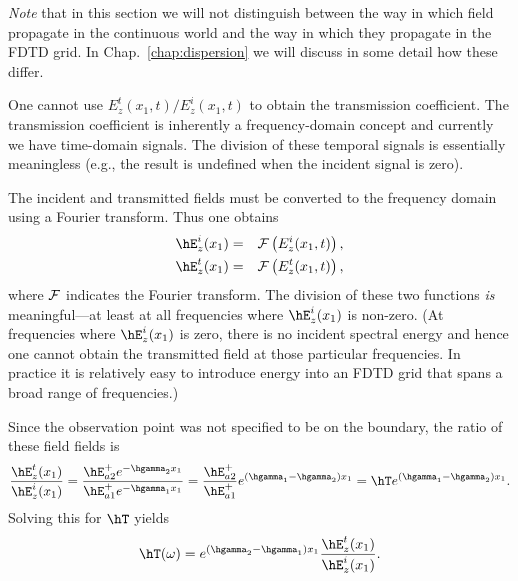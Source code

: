 {\em Note} that in this section we will not distinguish between the
way in which field propagate in the continuous world and the way in
which they propagate in the FDTD grid.  In
Chap.\ \ref{chap:dispersion} we will discuss in some detail how these
differ.

One cannot use $E_z^t(x_1,t)/E_z^i(x_1,t)$ to obtain the transmission
coefficient.  The transmission coefficient is inherently a
frequency-domain concept and currently we have time-domain signals.
The division of these temporal signals is essentially meaningless
(e.g., the result is undefined when the incident signal is zero).

The incident and transmitted fields must be converted to the frequency
domain using a Fourier transform.  Thus one obtains
\begin{eqnarray}
 \hE_z^i(x_1) &=& {\cal F}\left(E_z^i(x_1,t)\right), \\
 \hE_z^t(x_1) &=&  {\cal F}\left(E_z^t(x_1,t)\right),
\end{eqnarray} 
where ${\cal F}$ indicates the Fourier transform.  The division of
these two functions {\em is} meaningful---at least at all frequencies
where $\hE_z^i(x_1)$ is non-zero.  (At frequencies where
$\hE_z^i(x_1)$ is zero, there is no incident spectral energy and hence
one cannot obtain the transmitted field at those particular
frequencies.  In practice it is relatively easy to introduce energy
into an FDTD grid that spans a broad range of frequencies.)

Since the observation point was not specified to be on the boundary,
the ratio of these field fields is
\begin{equation}
  \frac{\hE_z^t(x_1)}{\hE_z^i(x_1)} =
  \frac{\hE_{a2}^+e^{-\hgamma_2 x_1}}{\hE_{a1}^+e^{-\hgamma_1 x_1}} =
  \frac{\hE_{a2}^+}{\hE_{a1}^+}e^{(\hgamma_1-\hgamma_2) x_1} =
  \hT e^{(\hgamma_1-\hgamma_2) x_1}.
\end{equation}
Solving this for $\hT$ yields
\begin{equation}
  \hT(\omega) = e^{(\hgamma_2-\hgamma_1) x_1}
  \frac{\hE_z^t(x_1)}{\hE_z^i(x_1)}.
  \label{eq:transCoefShifted}
\end{equation}

